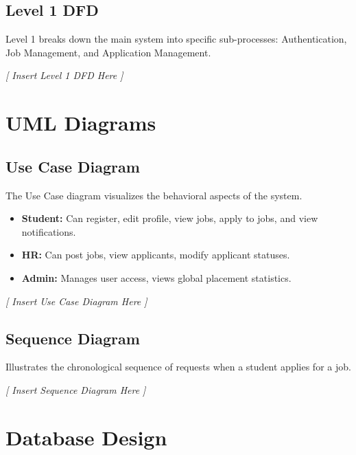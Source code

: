 \documentclass[a4paper,12pt]{report}
\begin{document}
\subsection{Level 1 DFD}
Level 1 breaks down the main system into specific sub-processes: Authentication, Job Management, and Application Management.

\vspace{1cm}
\begin{center}
\textit{[ Insert Level 1 DFD Here ]}
\end{center}
\vspace{1cm}

\section{UML Diagrams}

\subsection{Use Case Diagram}
The Use Case diagram visualizes the behavioral aspects of the system.
\begin{itemize}
    \item \textbf{Student:} Can register, edit profile, view jobs, apply to jobs, and view notifications.
    \item \textbf{HR:} Can post jobs, view applicants, modify applicant statuses.
    \item \textbf{Admin:} Manages user access, views global placement statistics.
\end{itemize}

\vspace{1cm}
\begin{center}
\textit{[ Insert Use Case Diagram Here ]}
\end{center}
\vspace{1cm}

\subsection{Sequence Diagram}
Illustrates the chronological sequence of requests when a student applies for a job.
\vspace{1cm}
\begin{center}
\textit{[ Insert Sequence Diagram Here ]}
\end{center}
\vspace{1cm}

\section{Database Design}
\end{document}
